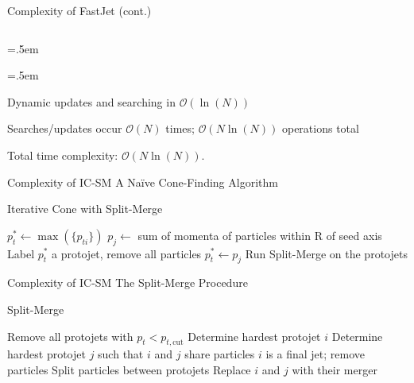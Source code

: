 \documentclass[xcolor={dvipsnames}]{beamer}
\let\olditemize=\itemize
\let\endolditemize=\enditemize
\renewenvironment{itemize}{\olditemize \itemsep=.5em }{\endolditemize}
\newcommand{\ord}[1]{\mathcal{O}(#1)}
\begin{document}
\begin{frame}{Complexity of FastJet (cont.)}
\begin{columns}[totalwidth=1.2\textwidth]
\begin{column}{.45\textwidth}
\end{column}
\end{columns}
\begin{itemize}
    \item[]
    \begin{itemize}
        \vspace{-1.15em}
        \item<8-> Dynamic updates and searching in $\ord{\ln(N)}$
        \item<9-> Searches/updates occur $\ord{N}$ times; $\ord{N\ln(N)}$ operations total
    \end{itemize}
    \item<10-> Total time complexity: $\ord{N\ln(N)}$.
\end{itemize}
\end{frame}

\begin{frame}{Complexity of IC-SM}
\alert{A Naïve Cone-Finding Algorithm}
\begin{algorithm}[H]
    \caption{Iterative Cone with Split-Merge}
    \begin{algorithmic}[1]
        \Repeat
            \State $p_t^* \gets \max(\{p_{ti}\})$ 
            \Repeat
                \State $p_j \gets$ sum of momenta of particles within R of seed axis
                    \State Label $p_t^*$ a protojet, remove all particles
                \Else
                    \State $p_t^* \gets p_j$
                \EndIf
        \State Run Split-Merge on the protojets
    \end{algorithmic}
\end{algorithm}
\end{frame}

\begin{frame}{Complexity of IC-SM}
\alert{The Split-Merge Procedure}
\begin{algorithm}[H]
    \caption{Split-Merge}
    \begin{algorithmic}[1]
        \State Remove all protojets with $p_t < p_{t,\text{cut}}$
        \Repeat
            \State Determine hardest protojet $i$
            \State Determine hardest protojet $j$ such that $i$ and $j$ share particles
                \State $i$ is a final jet; remove particles
            \Else
                    \State Split particles between protojets
                \Else
                    \State Replace $i$ and $j$ with their merger
                \EndIf
            \EndIf
    \end{algorithmic}
\end{algorithm}
\end{frame}
\end{document}
